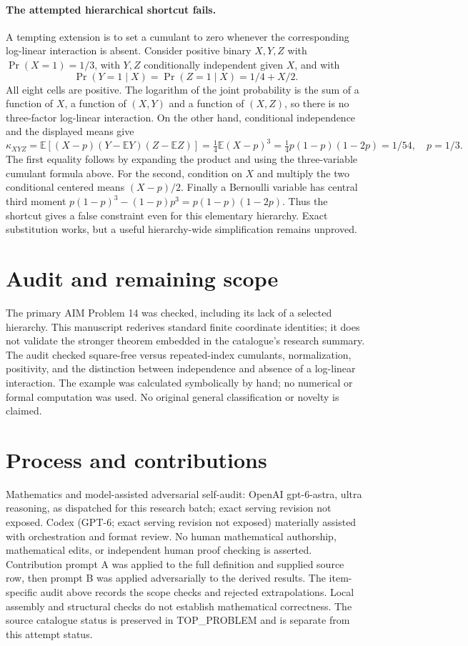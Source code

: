\documentclass[11pt]{article}
\begin{document}
\paragraph{The attempted hierarchical shortcut fails.}
A tempting extension is to set a cumulant to zero whenever the
corresponding log-linear interaction is absent. Consider positive
binary $X,Y,Z$ with $\Pr(X=1)=1/3$, with $Y,Z$ conditionally independent
given $X$, and with
\[
\Pr(Y=1\mid X)=\Pr(Z=1\mid X)=1/4+X/2.
\]
All eight cells are positive. The logarithm of the joint probability
is the sum of a function of $X$, a function of $(X,Y)$ and a function
of $(X,Z)$, so there is no three-factor log-linear interaction.
On the other hand, conditional independence and the displayed means give
\[
\kappa_{XYZ}=\mathbb E[(X-p)(Y-\mathbb EY)(Z-\mathbb EZ)]
 =\tfrac14\mathbb E(X-p)^3
 =\tfrac14p(1-p)(1-2p)=1/54,
\quad p=1/3.
\]
The first equality follows by expanding the product and using the
three-variable cumulant formula above. For the second, condition on
$X$ and multiply the two conditional centered means $(X-p)/2$.
Finally a Bernoulli variable has central third moment
$p(1-p)^3-(1-p)p^3=p(1-p)(1-2p)$. Thus the shortcut gives a false
constraint even for this elementary hierarchy. Exact substitution works,
but a useful hierarchy-wide simplification remains unproved.

\section{Audit and remaining scope}
The primary AIM Problem 14 was checked, including its lack of a selected
hierarchy. This manuscript rederives standard finite coordinate identities;
it does not validate the stronger theorem embedded in the catalogue's
research summary. The audit checked square-free versus repeated-index
cumulants, normalization, positivity, and the distinction between
independence and absence of a log-linear interaction. The example was
calculated symbolically by hand; no numerical or formal computation was
used. No original general classification or novelty is claimed.

\section{Process and contributions}
Mathematics and model-assisted adversarial self-audit: OpenAI gpt-6-astra, ultra reasoning, as dispatched for this research batch; exact serving revision not exposed. Codex (GPT-6; exact serving revision not exposed) materially assisted with orchestration and format review. No human mathematical authorship, mathematical edits, or independent human proof checking is asserted.
Contribution prompt A was applied to the full definition and supplied source row, then prompt B was applied adversarially to the derived results. The item-specific audit above records the scope checks and rejected extrapolations. Local assembly and structural checks do not establish mathematical correctness. The source catalogue status is preserved in TOP\_PROBLEM and is separate from this attempt status.
\end{document}
